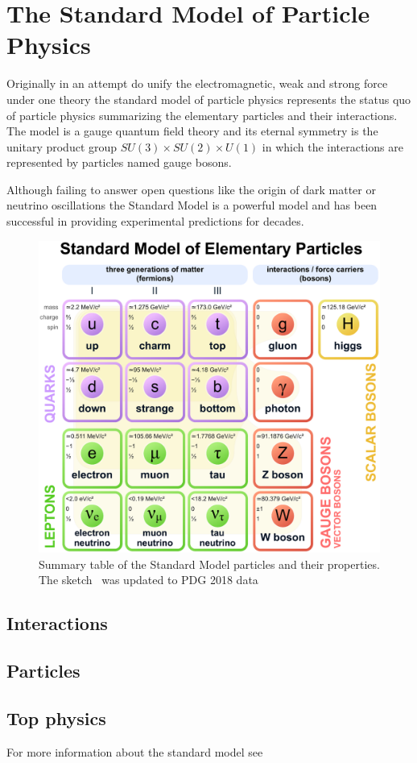 



\chapter{The Standard Model of Particle Physics}
\label{chp:sm}

Originally in an attempt do unify the electromagnetic, weak and strong force under one theory the standard model of particle physics represents the status quo of particle physics summarizing the elementary particles and their interactions.
The model is a gauge quantum field theory and its eternal symmetry is the unitary product group $SU(3) \times SU(2) \times U(1)$ in which the interactions are represented by particles named gauge bosons.

Although failing to answer open questions like the origin of dark matter or neutrino oscillations the Standard Model is a powerful model and has been successful in providing experimental predictions for decades.

\begin{figure}
	\centering
	\includegraphics[width=\textwidth]{figures_SM/standard_model.eps}
	\caption[Standard Model particles]{Summary table of the Standard Model particles and their properties. The sketch~\cite{standard_model} was updated to PDG 2018 data~\cite{PDG}}
	\label{fig:sm}
\end{figure}



\section{Interactions}

\section{Particles}

\section{Top physics}

For more information about the standard model see ~\cite{thomson, griffiths}